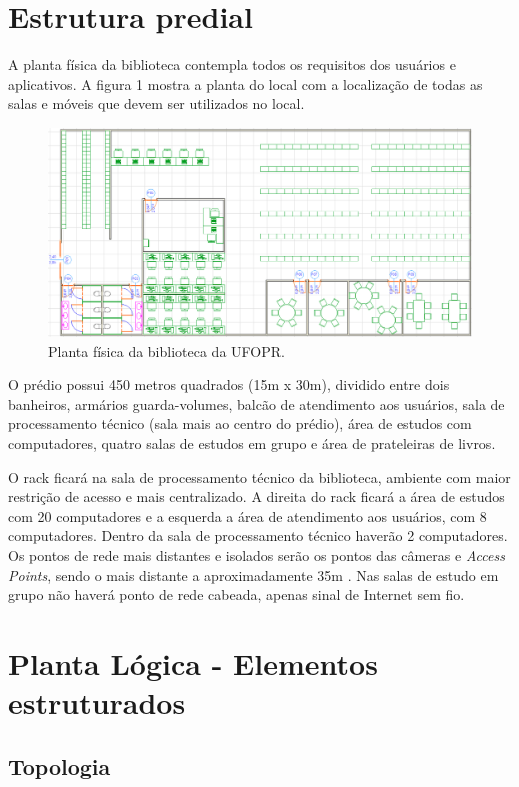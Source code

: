 \documentclass[	DIV=calc,%
							paper=a4,%
							fontsize=12pt,%
							onecolumn]{scrartcl}	 					%
\begin{document}
\section{Estrutura predial}
A planta física da biblioteca contempla todos os requisitos dos usuários e aplicativos. A figura 1 mostra a planta do local com a localização de todas as salas e móveis que devem ser utilizados no local.

\begin{figure}[h!]
	\centering
	\includegraphics[width=\textwidth]{planta-fisica}
	\caption{Planta física da biblioteca da UFOPR.}
	\label{planta-fisica}
\end{figure}

O prédio possui 450 metros quadrados (15m x 30m), dividido entre dois banheiros, armários guarda-volumes, balcão de atendimento aos usuários, sala de processamento técnico (sala mais ao centro do prédio), área de estudos com computadores, quatro salas de estudos em grupo e área de prateleiras de livros.

O rack ficará na sala de processamento técnico da biblioteca, ambiente com maior restrição de acesso e mais centralizado. A direita do rack ficará a área de estudos com 20 computadores e a esquerda a área de atendimento aos usuários, com 8 computadores. Dentro da sala de processamento técnico haverão 2 computadores. Os pontos de rede mais distantes e isolados serão os pontos das câmeras e \textit{Access Points}, sendo o mais distante a aproximadamente 35m . Nas salas de estudo em grupo não haverá ponto de rede cabeada, apenas sinal de Internet sem fio.

\section{Planta Lógica - Elementos estruturados}

\subsection{Topologia}
\end{document}
